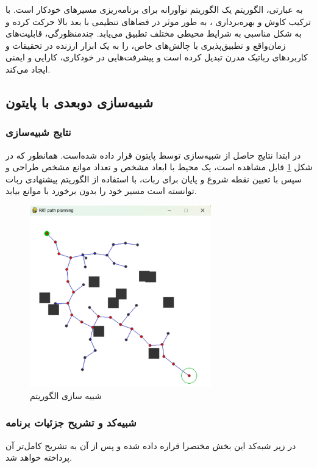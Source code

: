 به عبارتی، الگوریتم
یک الگوریتم نوآورانه برای برنامه‌ریزی مسیرهای خودکار است. با ترکیب کاوش و بهره‌برداری ،
به طور موثر در فضاهای تنظیمی با بعد بالا حرکت کرده و به شکل مناسبی به شرایط محیطی مختلف تطبیق می‌یابد. چندمنظورگی، قابلیت‌های زمان‌واقع و تطبیق‌پذیری با چالش‌های خاص،
را به یک ابزار ارزنده در تحقیقات و کاربردهای رباتیک مدرن تبدیل کرده است و پیشرفت‌هایی در خودکاری، کارایی و ایمنی ایجاد می‌کند.


\subsection{شبیه‌سازی دوبعدی با پایتون}
\subsubsection{نتایج شبیه‌سازی}
در ابتدا نتایج حاصل از شبیه‌سازی توسط پایتون قرار داده‌ شده‌است. همانطور که در شکل
\ref{نتیجه شبیه‌سازی RRT}
قابل مشاهده است، یک محیط با ابعاد مشخص و تعداد موانع مشخص طراحی و سپس با تعیین نقطه شروع و پایان برای ربات، با استفاده از الگوریتم پیشنهادی ربات توانسته است مسیر خود را بدون برخورد با موانع بیابد.
\begin{figure}[H]
	\centering
	\includegraphics[width=0.7\textwidth]{./images/Chapter2/ConvexResult}	
	\caption[شبیه سازی الگوریتم ]{شبیه سازی الگوریتم }
	\label{نتیجه شبیه‌سازی RRT}
\end{figure}
\noindent
\unskip

\subsubsection{شبیه‌کد و تشریح جزئیات برنامه}
در زیر شبه‌کد این بخش مختصرا قراره داده شده و پس از آن به تشریح کامل‌تر آن پرداخته خواهد شد.
